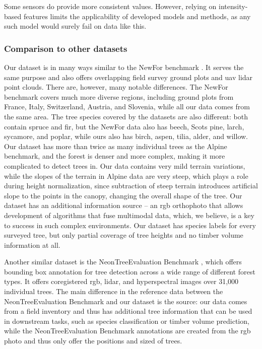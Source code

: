 Some sensors do provide more consistent values.
However, relying on intensity-based features limits the applicability of developed models and methods, as any such model would surely fail on data like this.

\subsubsection{Comparison to other datasets}

Our dataset is in many ways similar to the NewFor benchmark \cite{eysnAlpineITDBenchmark2015}.
It serves the same purpose and also offers overlapping field survey ground plots and \gls{uav} \gls{lidar} point clouds.
There are, however, many notable differences.
The NewFor benchmark covers much more diverse regions, including ground plots from France, Italy, Switzerland, Austria, and Slovenia, while all our data comes from the same area.
The tree species covered by the datasets are also different: both contain spruce and fir, but the NewFor data also has beech, Scots pine, larch, sycamore, and poplar, while ours also has birch, aspen, tilia, alder, and willow.
Our dataset has more than twice as many individual trees as the Alpine benchmark, and the forest is denser and more complex, making it more complicated to detect trees in.
Our data contains very mild terrain variations, while the slopes of the terrain in Alpine data are very steep, which plays a role during height normalization, since subtraction of steep terrain introduces artificial slope to the points in the canopy, changing the overall shape of the tree.
Our dataset has an additional information source – an \gls{rgb} orthophoto that allows development of algorithms that fuse multimodal data, which, we believe, is a key to success in such complex environments.
Our dataset has species labels for every surveyed tree, but only partial coverage of tree heights and no timber volume information at all.

Another similar dataset is the NeonTreeEvaluation Benchmark \cite{weinsteinDataNeonTreeEvaluationBenchmark2022}, which offers bounding box annotation for tree detection across a wide range of different forest types.
It offers coregistered \gls{rgb}, \gls{lidar}, and hyperspectral images over 31,000 individual trees.
The main difference in the reference data between the NeonTreeEvaluation Benchmark and our dataset is the source: our data comes from a field inventory and thus has additional tree information that can be used in downstream tasks, such as species classification or timber volume prediction, while the NeonTreeEvaluation Benchmark annotations are created from the \gls{rgb} photo and thus only offer the positions and sized of trees.

